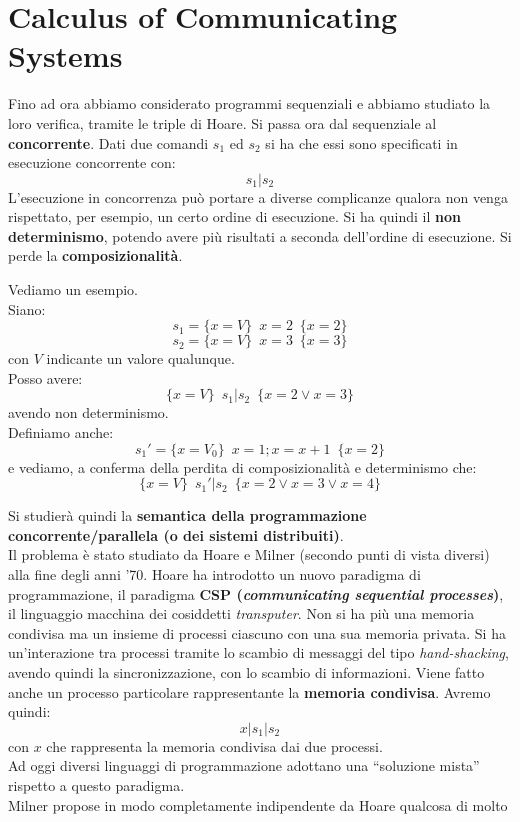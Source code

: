 \documentclass[a4paper,12pt, oneside]{book}
\begin{document}
\chapter{Calculus of Communicating Systems}
Fino ad ora abbiamo considerato programmi sequenziali e abbiamo studiato la loro
verifica, tramite le triple di Hoare. Si passa ora dal sequenziale al
\textbf{concorrente}. Dati due comandi $s_1$ ed $s_2$ si ha che essi sono
specificati in esecuzione concorrente con:
\[s_1|s_2\]
L'esecuzione in concorrenza può portare a diverse complicanze qualora non venga
rispettato, per esempio, un certo ordine di esecuzione. Si ha quindi il
\textbf{non determinismo}, potendo avere più risultati a seconda dell'ordine di
esecuzione. Si perde la \textbf{composizionalità}.
\begin{esempio}
  Vediamo un esempio.\\
  Siano:
  \[s_1=\{x=V\}\,\,\,x=2\,\,\,\{x=2\}\]
  \[s_2=\{x=V\}\,\,\,x=3\,\,\,\{x=3\}\]
  con $V$ indicante un valore qualunque.\\
  Posso avere:
  \[\{x=V\}\,\,\,s_1|s_2\,\,\,\{x=2\lor x=3\}\]
  avendo non determinismo.\\
  Definiamo anche:
  \[s_1'=\{x=V_0\}\,\,\,x=1;x=x+1\,\,\,\{x=2\}\]
  e vediamo, a conferma della perdita di composizionalità e determinismo che:
  \[\{x=V\}\,\,\,s_1'|s_2\,\,\,\{x=2\lor x=3\lor x=4\}\]
\end{esempio}
Si studierà quindi la \textbf{semantica della programmazione
  concorrente/parallela (o dei sistemi distribuiti)}.\\
Il problema è stato studiato da Hoare e Milner (secondo punti di vista diversi)
alla fine degli anni '70. Hoare ha introdotto un nuovo paradigma di
programmazione, il paradigma \textbf{CSP (\textit{communicating sequential
    processes})}, il linguaggio macchina dei cosiddetti \textit{transputer}. Non
si ha più una memoria condivisa ma un insieme di processi ciascuno con una sua
memoria privata. Si ha un'interazione tra processi tramite lo scambio di
messaggi del tipo \textit{hand-shacking}, avendo quindi la sincronizzazione, con
lo scambio di informazioni. Viene fatto anche un processo particolare
rappresentante la \textbf{memoria condivisa}. Avremo quindi:
\[x|s_1|s_2\]
con $x$ che rappresenta la memoria condivisa dai due processi.\\
Ad oggi diversi linguaggi di programmazione adottano una ``soluzione mista''
rispetto a questo paradigma.\\
Milner propose in modo completamente indipendente da Hoare qualcosa di molto
\end{document}
